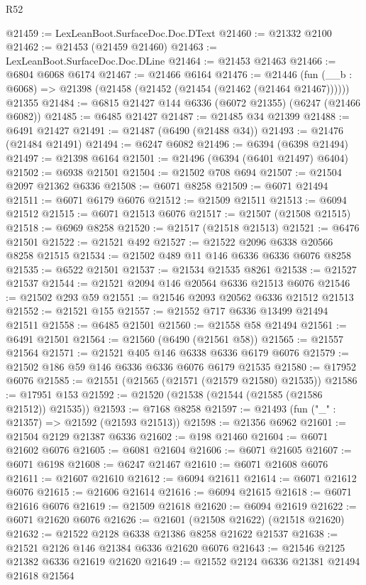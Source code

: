 \begin{lexlean}{R52}
\begin{coremodule}
@21459 := LexLeanBoot.SurfaceDoc.Doc.DText
@21460 := @21332 @2100
@21462 := @21453 (@21459 @21460)
@21463 := LexLeanBoot.SurfaceDoc.Doc.DLine
@21464 := @21453 @21463
@21466 := @6804 @6068 @6174
@21467 := @21466 @6164
@21476 := @21446
    (fun (__b : @6068) => @21398 (@21458 (@21452 (@21454 (@21462 (@21464 @21467))))))
    @21355
@21484 := @6815 @21427 @144 @6336 (@6072 @21355) (@6247 (@21466 @6082))
@21485 := @6485 @21427
@21487 := @21485 @34 @21399
@21488 := @6491 @21427
@21491 := @21487 (@6490 (@21488 @34))
@21493 := @21476 (@21484 @21491)
@21494 := @6247 @6082
@21496 := @6394 (@6398 @21494)
@21497 := @21398 @6164
@21501 := @21496 (@6394 (@6401 @21497) @6404)
@21502 := @6938 @21501
@21504 := @21502 @708 @694
@21507 := @21504 @2097 @21362 @6336
@21508 := @6071 @8258
@21509 := @6071 @21494
@21511 := @6071 @6179 @6076
@21512 := @21509 @21511
@21513 := @6094 @21512
@21515 := @6071 @21513 @6076
@21517 := @21507 (@21508 @21515)
@21518 := @6969 @8258
@21520 := @21517 (@21518 @21513)
@21521 := @6476 @21501
@21522 := @21521 @492
@21527 := @21522 @2096 @6338 @20566 @8258 @21515
@21534 := @21502 @489 @11 @146 @6336 @6336 @6076 @8258
@21535 := @6522 @21501
@21537 := @21534 @21535 @8261
@21538 := @21527 @21537
@21544 := @21521 @2094 @146 @20564 @6336 @21513 @6076
@21546 := @21502 @293 @59
@21551 := @21546 @2093 @20562 @6336 @21512 @21513
@21552 := @21521 @155
@21557 := @21552 @717 @6336 @13499 @21494 @21511
@21558 := @6485 @21501
@21560 := @21558 @58 @21494
@21561 := @6491 @21501
@21564 := @21560 (@6490 (@21561 @58))
@21565 := @21557 @21564
@21571 := @21521 @405 @146 @6338 @6336 @6179 @6076
@21579 := @21502 @186 @59 @146 @6336 @6336 @6076 @6179 @21535
@21580 := @17952 @6076
@21585 := @21551 (@21565 (@21571 (@21579 @21580) @21535))
@21586 := @17951 @153
@21592 := @21520 (@21538 (@21544 (@21585 (@21586 @21512)) @21535))
@21593 := @7168 @8258
@21597 := @21493 (fun ("_" : @21357) => @21592 (@21593 @21513))
@21598 := @21356 @6962
@21601 := @21504 @2129 @21387 @6336
@21602 := @198 @21460
@21604 := @6071 @21602 @6076
@21605 := @6081 @21604
@21606 := @6071 @21605
@21607 := @6071 @6198
@21608 := @6247 @21467
@21610 := @6071 @21608 @6076
@21611 := @21607 @21610
@21612 := @6094 @21611
@21614 := @6071 @21612 @6076
@21615 := @21606 @21614
@21616 := @6094 @21615
@21618 := @6071 @21616 @6076
@21619 := @21509 @21618
@21620 := @6094 @21619
@21622 := @6071 @21620 @6076
@21626 := @21601 (@21508 @21622) (@21518 @21620)
@21632 := @21522 @2128 @6338 @21386 @8258 @21622 @21537
@21638 := @21521 @2126 @146 @21384 @6336 @21620 @6076
@21643 := @21546 @2125 @21382 @6336 @21619 @21620
@21649 := @21552 @2124 @6336 @21381 @21494 @21618 @21564

\end{coremodule}
\end{lexlean}
